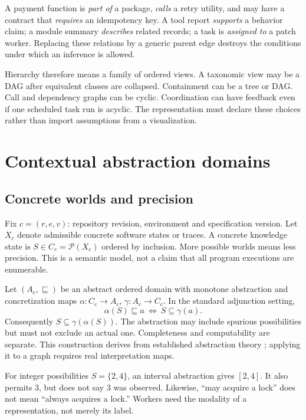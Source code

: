 \documentclass[11pt]{article}
\newcommand{\powerset}{\mathcal{P}}\newcommand{\ctx}{\mathsf{ctx}}\newcommand{\llbracket}{[\![}\newcommand{\rrbracket}{]\!]}
\begin{document}
A payment function is \emph{part of} a package, \emph{calls} a retry utility, and may have a contract that \emph{requires} an idempotency key. A tool report \emph{supports} a behavior claim; a module summary \emph{describes} related records; a task is \emph{assigned to} a patch worker. Replacing these relations by a generic parent edge destroys the conditions under which an inference is allowed.

Hierarchy therefore means a family of ordered views. A taxonomic view may be a DAG after equivalent classes are collapsed. Containment can be a tree or DAG. Call and dependency graphs can be cyclic. Coordination can have feedback even if one scheduled task run is acyclic. The representation must declare these choices rather than import assumptions from a visualization.

\section{Contextual abstraction domains}
\subsection{Concrete worlds and precision}
Fix $c=(r,e,v)$: repository revision, environment and specification version. Let $X_c$ denote admissible concrete software states or traces. A concrete knowledge state is $S\in C_c=\powerset(X_c)$ ordered by inclusion. More possible worlds means less precision. This is a semantic model, not a claim that all program executions are enumerable.

Let $(A_c,\sqsubseteq)$ be an abstract ordered domain with monotone abstraction and concretization maps $\alpha:C_c\to A_c$, $\gamma:A_c\to C_c$. In the standard adjunction setting,
\begin{equation}
\alpha(S)\sqsubseteq a\ \Longleftrightarrow\ S\subseteq\gamma(a).
\label{eq:adjunction}
\end{equation}
Consequently $S\subseteq\gamma(\alpha(S))$. The abstraction may include spurious possibilities but must not exclude an actual one. Completeness and computability are separate. This construction derives from established abstraction theory \citep{cousot1977}; applying it to a graph requires real interpretation maps.

For integer possibilities $S=\{2,4\}$, an interval abstraction gives $[2,4]$. It also permits 3, but does not say 3 was observed. Likewise, ``may acquire a lock'' does not mean ``always acquires a lock.'' Workers need the modality of a representation, not merely its label.
\end{document}
